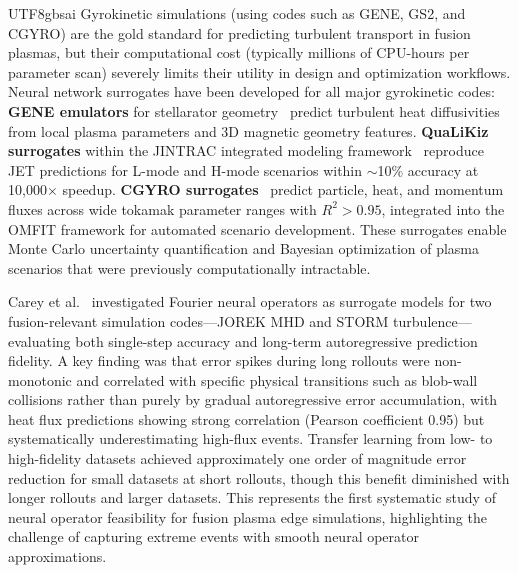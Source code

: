\documentclass[12pt,a4paper]{article}
\begin{document}
\begin{CJK}{UTF8}{gbsai}
Gyrokinetic simulations (using codes such as GENE, GS2, and CGYRO) are the gold standard for predicting turbulent transport in fusion plasmas, but their computational cost (typically millions of CPU-hours per parameter scan) severely limits their utility in design and optimization workflows. Neural network surrogates have been developed for all major gyrokinetic codes: \textbf{GENE emulators} for stellarator geometry~\citep{Mathews2024} predict turbulent heat diffusivities from local plasma parameters and 3D magnetic geometry features. \textbf{QuaLiKiz surrogates} within the JINTRAC integrated modeling framework~\citep{Ho2024} reproduce JET predictions for L-mode and H-mode scenarios within $\sim$10\% accuracy at 10,000$\times$ speedup. \textbf{CGYRO surrogates}~\citep{Belli2024} predict particle, heat, and momentum fluxes across wide tokamak parameter ranges with $R^2 > 0.95$, integrated into the OMFIT framework for automated scenario development. These surrogates enable Monte Carlo uncertainty quantification and Bayesian optimization of plasma scenarios that were previously computationally intractable.

Carey et al.~\citep{Carey2025} investigated Fourier neural operators as surrogate models for two fusion-relevant simulation codes---JOREK MHD and STORM turbulence---evaluating both single-step accuracy and long-term autoregressive prediction fidelity. A key finding was that error spikes during long rollouts were non-monotonic and correlated with specific physical transitions such as blob-wall collisions rather than purely by gradual autoregressive error accumulation, with heat flux predictions showing strong correlation (Pearson coefficient 0.95) but systematically underestimating high-flux events. Transfer learning from low- to high-fidelity datasets achieved approximately one order of magnitude error reduction for small datasets at short rollouts, though this benefit diminished with longer rollouts and larger datasets. This represents the first systematic study of neural operator feasibility for fusion plasma edge simulations, highlighting the challenge of capturing extreme events with smooth neural operator approximations.


\end{CJK}
\end{document}
